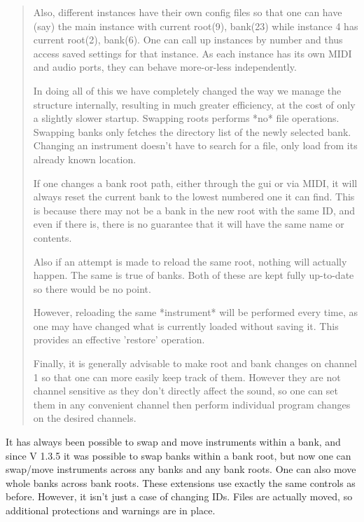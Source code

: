 \begin{quotation}
      Also, different instances have their own config files so that one can
      have (say) the main instance with current root(9), bank(23) while
      instance 4 has current root(2), bank(6). One can call up instances by
      number and thus access saved settings for that instance. As each instance
      has its own MIDI and audio ports, they can behave more-or-less
      independently.

      In doing all of this we have completely changed the way we manage the
      structure internally, resulting in much greater efficiency, at the cost
      of only a slightly slower startup. Swapping roots performs *no* file
      operations. Swapping banks only fetches the directory list of the newly
      selected bank. Changing an instrument doesn't have to search for a file,
      only load from its already known location.

      If one changes a bank root path, either through the gui or via MIDI, it
      will always reset the current bank to the lowest numbered one it can
      find. This is because there may not be a bank in the new root with the
      same ID, and even if there is, there is no guarantee that it will have
      the same name or contents.

      Also if an attempt is made to reload the same root, nothing will actually
      happen. The same is true of banks. Both of these are kept fully
      up-to-date so there would be no point.

      However, reloading the same *instrument* will be performed every time, as
      one may have changed what is currently loaded without saving it. This
      provides an effective 'restore' operation.

      Finally, it is generally advisable to make root and bank changes on
      channel 1 so that one can more easily keep track of them. However they
      are not channel sensitive as they don't directly affect the sound, so one
      can set them in any convenient channel then perform individual program
      changes on the desired channels.
   \end{quotation}

   It has always been possible to swap and move instruments within a bank, and
   since V 1.3.5 it was possible to swap banks within a bank root, but now one can
   swap/move instruments across any banks and any bank roots. One can also move
   whole banks across bank roots.  These extensions use exactly the same controls
   as before. However, it isn't just a case of changing IDs. Files are actually
   moved, so additional protections and warnings are in place.

